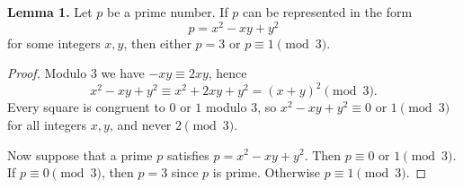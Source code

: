 \begin{thmbox}
\textbf{Lemma 1.} Let $p$ be a prime number. If $p$ can be represented in the form
\[
p = x^2 - xy + y^2
\]
for some integers $x,y$, then either $p=3$ or $p \equiv 1 \pmod{3}$.
\end{thmbox}

\begin{proof}
Modulo $3$ we have $-xy\equiv 2xy$, hence
\[
x^2 - xy + y^2 \equiv x^2+2xy+y^2=(x+y)^2 \pmod 3.
\]
Every square is congruent to $0$ or $1$ modulo $3$, so $x^2-xy+y^2\equiv 0$ or $1 \pmod 3$ for all integers $x,y$, and never $2 \pmod 3$.

Now suppose that a prime $p$ satisfies $p = x^2 - xy + y^2$. Then $p\equiv 0$ or $1 \pmod 3$. If $p \equiv 0 \pmod{3}$, then $p=3$ since $p$ is prime. Otherwise $p \equiv 1 \pmod{3}$.
\end{proof}
